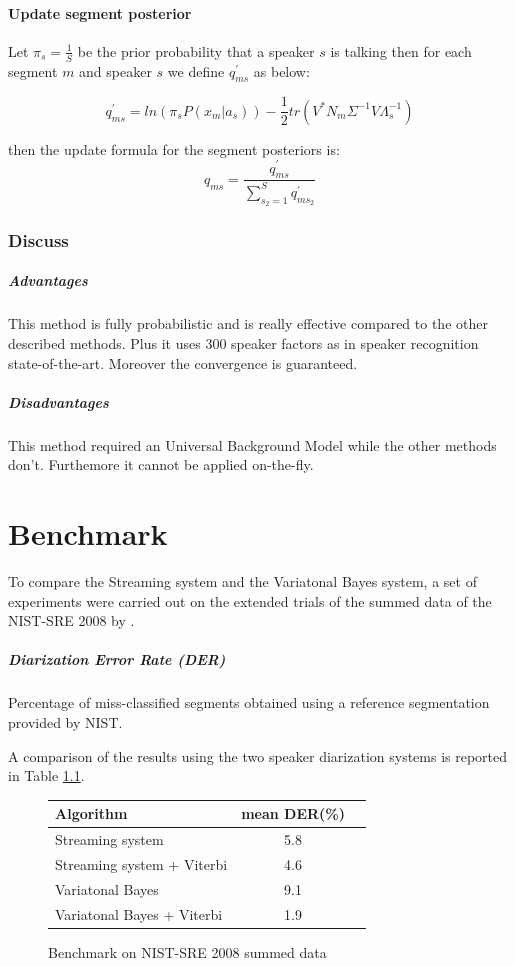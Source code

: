 \documentclass{techrep} %
\begin{document}
\subsubsection{Update segment posterior}
Let $\pi_s = \frac{1}{S}$ be the prior probability that a speaker $s$
is talking then for each segment $m$ and speaker $s$ we define
$q_{ms}^{'}$ as below:

$$q_{ms}^{'} = ln(\pi_sP(x_m|a_s)) - \frac{1}{2}tr(V^*N_m\Sigma^{-1}V\Lambda_s^{-1})$$

then the update formula for the segment posteriors is:
$$q_{ms} = \frac{q_{ms}^{'}}{\sum_{s_2=1}^{S}{q_{ms_2}^{'}}}$$%
\subsection{Discuss}
\paragraph{Advantages} This method is fully probabilistic and is really effective compared to the other described methods. Plus it uses 300 speaker factors as in speaker recognition state-of-the-art. Moreover the convergence is guaranteed.

\paragraph{Disadvantages} This method required an Universal Background Model while the other methods don't. Furthemore it cannot be applied on-the-fly.
\chapter{Benchmark}

To compare the Streaming system and the Variatonal Bayes system, a set
of experiments were carried out on the extended trials of the summed
data of the NIST-SRE 2008 by \cite{DIAFACT}.


\paragraph{Diarization Error Rate (DER)} Percentage of miss-classified segments obtained using a reference segmentation provided by NIST.

A comparison of the results using the two speaker diarization
systems is reported in Table \ref{benchou}.\\

\begin{figure}[H]
  \centering
  \begin{tabular}{|l|c|r|}
    \hline
    \textbf{Algorithm} & \textbf{mean DER(\%)} \\
    \hline
    Streaming system & 5.8\\
    \hline
    Streaming system + Viterbi & 4.6\\
    \hline
    Variatonal Bayes & 9.1\\
    \hline
    Variatonal Bayes + Viterbi & 1.9\\
    \hline
  \end{tabular}
  \label{benchou}
  \caption{Benchmark on NIST-SRE 2008 summed data}
\end{figure}
\end{document}
